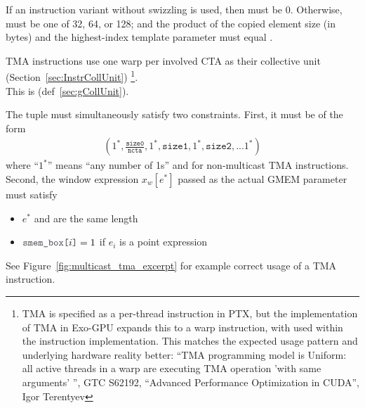 If an instruction variant without swizzling is used, then  must be 0.
Otherwise,  must be one of 32, 64, or 128; and the product of the copied element size (in bytes) and the highest-index  template parameter must equal .

TMA instructions use one warp per involved CTA as their collective unit (Section~\ref{sec:InstrCollUnit})%
\footnote{TMA is specified as a per-thread instruction in PTX, but the implementation of TMA in Exo-GPU expands this to a warp instruction, with  used within the instruction implementation.
This matches the expected usage pattern and underlying hardware reality better: ``TMA programming model is Uniform: all active threads in a warp are executing TMA operation 'with same arguments' '', GTC S62192, ``Advanced Performance Optimization in CUDA'', Igor Terentyev}.\\
This is  (def~\ref{sec:gCollUnit}).

The  tuple must simultaneously satisfy two constraints.
First, it must be of the form
\begin{gather*}
    \left( 1^*, \frac{\texttt{size0}}{\texttt{ncta}}, 1^*, \texttt{size1}, 1^*, \texttt{size2}, ... 1^* \right)
\end{gather*}
where ``$1^*$'' means ``any number of 1s'' and  for non-multicast TMA instructions.
Second, the window expression $x_w[e^*]$ passed as the actual GMEM parameter must satisfy
\begin{itemize}
  \item $e^*$ and  are the same length
  \item $\lighttt{smem\_box[}i\lighttt{]} = 1$ if $e_i$ is a point expression
\end{itemize}

See Figure~\ref{fig:multicast_tma_excerpt} for example correct usage of a TMA instruction.
